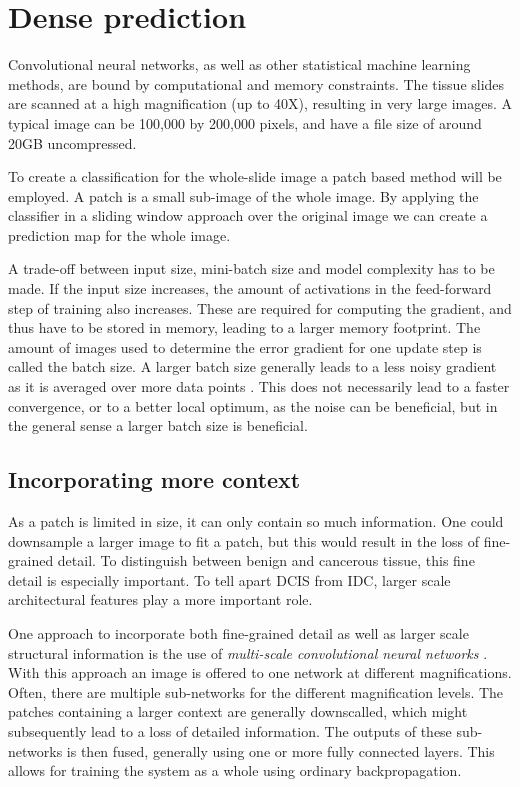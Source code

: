 \documentclass[journal]{IEEEtran}
\begin{document}
\section{Dense prediction}


Convolutional neural networks, as well as other statistical machine learning methods, are bound by computational and memory constraints. The tissue slides are scanned at a high magnification (up to 40X), resulting in very large images. A typical image can be 100,000 by 200,000 pixels, and have a file size of around 20GB uncompressed. 

To create a classification for the whole-slide image a patch based method will be employed. A patch is a small sub-image of the whole image. By applying the classifier in a sliding window approach over the original image we can create a prediction map for the whole image.

A trade-off between input size, mini-batch size and model complexity has to be made. If the input size increases, the amount of activations in the feed-forward step of training also increases. These are required for computing the gradient, and thus have to be stored in memory, leading to a larger memory footprint. The amount of images used to determine the error gradient for one update step is called the batch size. A larger batch size generally leads to a less noisy gradient as it is averaged over more data points \cite{bottou2016optimization}. This does not necessarily lead to a faster convergence, or to a better local optimum, as the noise can be beneficial, but in the general sense a larger batch size is beneficial. 

\subsection{Incorporating more context}

As a patch is limited in size, it can only contain so much information. One could downsample a larger image to fit a patch, but this would result in the loss of fine-grained detail. To distinguish between benign and cancerous tissue, this fine detail is especially important. To tell apart DCIS from IDC, larger scale architectural features play a more important role. 

One approach to incorporate both fine-grained detail as well as larger scale structural information is the use of \emph{multi-scale convolutional neural networks} \cite{multiscale_shen,buyssens2012multiscale}. With this approach an image is offered to one network at different magnifications. Often, there are multiple sub-networks for the different magnification levels. The patches containing a larger context are generally downscalled, which might subsequently lead to a loss of detailed information. The outputs of these sub-networks is then fused, generally using one or more fully connected layers. This allows for training the system as a whole using ordinary backpropagation.
\end{document}
